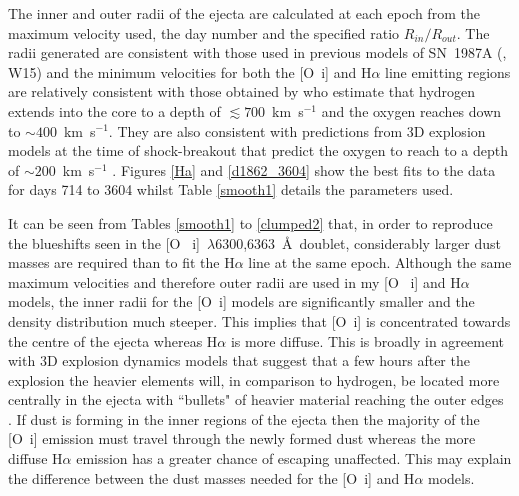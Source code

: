 The inner and outer radii of the ejecta are calculated at each epoch from 
the maximum velocity used, the day number and the specified ratio 
$R_{in}/R_{out}$.  The radii generated are consistent with those used in 
previous models of SN~1987A (\citet{Ercolano2007}, W15) and the 
minimum velocities for both the [O~{\sc i}] and H$\alpha$ line emitting 
regions are relatively consistent with those obtained by \citet{Kozma1998b} 
who estimate that  hydrogen extends into the core to a depth of 
$\lesssim 700$~km~s$^{-1}$ and the oxygen reaches down to $\sim 
400$~km~s$^{-1}$.  They are also consistent with predictions from 3D 
explosion models at the time of shock-breakout that predict the oxygen to 
reach to a depth of $\sim 200$~km~s$^{-1}$ 
\citep{Hammer2010,Wongwathanarat2015}. Figures \ref{Ha} and 
\ref{d1862_3604} show the best fits to the data for days 714 to 3604 
whilst Table \ref{smooth1} details the parameters used.




It can be seen from Tables \ref{smooth1} to \ref{clumped2} that, in order 
to reproduce the blueshifts seen in the [O~{\sc 
i}]~$\lambda$6300,6363~\AA\ doublet, considerably larger dust masses are 
required than to fit the H$\alpha$ line at the same epoch.  Although the 
same maximum velocities and therefore outer radii are used in my [O~{\sc 
i}] and H$\alpha$ models, the inner radii for the [O~{\sc i}] models are 
significantly smaller and the density distribution much steeper.  This 
implies that [O~{\sc i}] is concentrated towards the centre of the 
ejecta whereas H$\alpha$ is more diffuse.  This is broadly in 
agreement with 3D explosion dynamics models that suggest that a few hours 
after the explosion the heavier elements will, in comparison to hydrogen, 
be located more centrally in the ejecta with ``bullets" of heavier 
material reaching the outer edges \citep{Hammer2010}.  If dust is forming 
in the inner regions of the ejecta then the majority of the [O~{\sc i}] 
emission must travel through the newly formed dust whereas the more 
diffuse H$\alpha$ emission has a greater chance of escaping unaffected.  
This may explain the difference between the dust masses needed for the 
[O~{\sc i}] and H$\alpha$ models.


